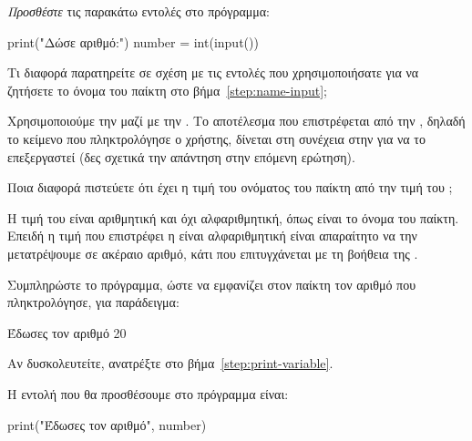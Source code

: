 \documentclass[a4paper,11pt,oneside]{book}
\begin{document}
\begin{step}
\label{step:number-input}
\emph{Προσθέστε} τις παρακάτω εντολές στο πρόγραμμα:

\begin{pynew}
print("Δώσε αριθμό:")
number = int(input())
\end{pynew}

Τι διαφορά παρατηρείτε σε σχέση με τις εντολές που χρησιμοποιήσατε για να ζητήσετε το όνομα του παίκτη στο βήμα~\ref{step:name-input};

\begin{answer}
Χρησιμοποιούμε την  μαζί με την . Το αποτέλεσμα που επιστρέφεται από την , δηλαδή το κείμενο που πληκτρολόγησε ο χρήστης, δίνεται στη συνέχεια στην  για να το επεξεργαστεί (δες σχετικά την απάντηση στην επόμενη ερώτηση).
\end{answer}

Ποια διαφορά πιστεύετε ότι έχει η τιμή του ονόματος του παίκτη από την τιμή του ;

\begin{answer}
Η τιμή του  είναι αριθμητική και όχι αλφαριθμητική, όπως είναι το όνομα του παίκτη. Επειδή η τιμή που επιστρέφει η  είναι αλφαριθμητική είναι απαραίτητο να την μετατρέψουμε σε ακέραιο αριθμό, κάτι που επιτυγχάνεται με τη βοήθεια της .
\end{answer}
\end{step}

\begin{step}
Συμπληρώστε το πρόγραμμα, ώστε να εμφανίζει στον παίκτη τον αριθμό που πληκτρολόγησε, για παράδειγμα:

\marginnote[16pt]{\iconcomputer}
\begin{pyterm}
Έδωσες τον αριθμό 20
\end{pyterm}

Αν δυσκολευτείτε, ανατρέξτε στο βήμα~\ref{step:print-variable}.

\begin{answer}
Η εντολή που θα προσθέσουμε στο πρόγραμμα είναι:
	
\begin{pynew}
print("Έδωσες τον αριθμό", number)
\end{pynew}
\end{answer}
\end{step}
\end{document}
